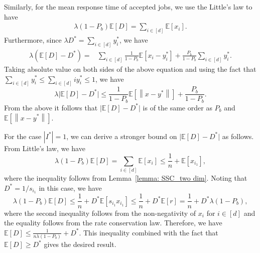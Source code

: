 \documentclass[a4paper]{article}
\theoremstyle{plain}
\theoremstyle{definition}
\theoremstyle{case}
\theoremstyle{remark}
\newcommand{\norm}[1]{\left\lVert#1\right\rVert}
\newcommand{\brac}[1]{\left(#1\right)}
\newcommand{\sbrac}[1]{\left[#1\right]}
\newcommand{\expect}[1]{\mathbb{E}\sbrac{#1}}
\newcommand{\abs}[1]{\lvert #1 \rvert}
\begin{document}
Similarly, for the mean response time of accepted jobs, we use the Little's law to have
\begin{align}
    \lambda \brac{1-P_b} \expect{D}  = \sum_{i \in [d]} \expect{x_i}.
\end{align}
%
%
Furthermore, since $\lambda D^* = \sum_{i \in [d]} y_i^*$, we have 
\begin{align}
    \lambda  (\expect{D}-D^*)=  &\sum_{i\in [d]}\frac{1}{1-P_b}\expect{x_i-y_i^*}+\frac{P_b}{1-P_b}\sum_{i \in [d]}y_i^*.\nonumber
\end{align}
%
Taking absolute value on both sides of the above equation and using the fact that $\sum_{i \in [d]}y_i^* \leq \sum_{i \in [d]}i y_i^* \leq 1$, we have
\begin{equation}
\lambda  \abs{\expect{D}-D^*}\leq  \frac{1}{1-P_b}\expect{\norm{x-y^*}}+\frac{P_b}{1-P_b}.
\end{equation}
%
From the above it follows that $\abs{\expect{D}-D^*}$ is of the same order as $P_b$ and $\expect{\norm{x-y^*}}$.



For the case $|I^*|=1$, we can derive a stronger bound on $\abs{\expect{D}-D^*}$ as follows. From Little's law, we have
\begin{equation}
    \lambda(1-P_b)\expect{D} = \sum_{i \in [d]} \expect{x_i} \leq \frac{1}{n} + \expect{x_{i_1}},
\end{equation}
%
where the inequality follows from Lemma~\ref{lemma: SSC_two dim}. Noting that $D^* = 1/s_{i_1}$ in this case, we have
\begin{equation*}
    \lambda(1-P_b)\expect{D} \leq \frac{1}{n} + D^*\expect{s_{i_1}x_{i_1}} \leq  \frac{1}{n} + D^*\expect{r} =  \frac{1}{n} + D^*\lambda(1-P_b),
\end{equation*}
%
where the second inequality follows from the non-negativity of $x_i$ for $i \in [d]$ and the equality follows from the rate conservation law. Therefore, we have $\expect{D} \leq \frac{1}{n\lambda(1-P_b)} + D^*$. This inequality combined with the fact that $\expect{D} \geq D^*$ gives the desired result.
\end{document}
